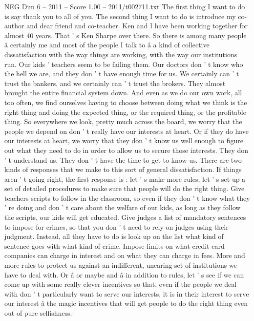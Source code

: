 \begin{textsample}{NEG Dim 6 – 2011 – Score 1.00 – 2011/t002711.txt}  \label{ex:f6_neg_045}
The first thing I want to do is say thank you to all of you.
The second thing I want to do is introduce my co-author and dear friend and co-teacher.
Ken and I have been working together for almost 40 years.
That ' s Ken Sharpe over there.
So there is among many people â certainly me and most of the people I talk to â a kind of collective dissatisfaction with the way things are working, with the way our institutions run.
Our kids ' teachers seem to be failing them.
Our doctors don ' t know who the hell we are, and they don ' t have enough time for us.
We certainly can ' t trust the bankers, and we certainly can ' t trust the brokers.
They almost brought the entire financial system down.
And even as we do our own work, all too often, we find ourselves having to choose between doing what we think is the right thing and doing the expected thing, or the required thing, or the profitable thing.
So everywhere we look, pretty much across the board, we worry that the people we depend on don ' t really have our interests at heart.
Or if they do have our interests at heart, we worry that they don ' t know us well enough to figure out what they need to do in order to allow us to secure those interests.
They don ' t understand us.
They don ' t have the time to get to know us.
There are two kinds of responses that we make to this sort of general dissatisfaction.
If things aren ' t going right, the first response is : let ' s make more rules, let ' s set up a set of detailed procedures to make sure that people will do the right thing.
Give teachers scripts to follow in the classroom, so even if they don ' t know what they ' re doing and don ' t care about the welfare of our kids, as long as they follow the scripts, our kids will get educated.
Give judges a list of mandatory sentences to impose for crimes, so that you don ' t need to rely on judges using their judgment.
Instead, all they have to do is look up on the list what kind of sentence goes with what kind of crime.
Impose limits on what credit card companies can charge in interest and on what they can charge in fees.
More and more rules to protect us against an indifferent, uncaring set of institutions we have to deal with.
Or â or maybe and â in addition to rules, let ' s see if we can come up with some really clever incentives so that, even if the people we deal with don ' t particularly want to serve our interests, it is in their interest to serve our interest â the magic incentives that will get people to do the right thing even out of pure selfishness.

\end{textsample}
